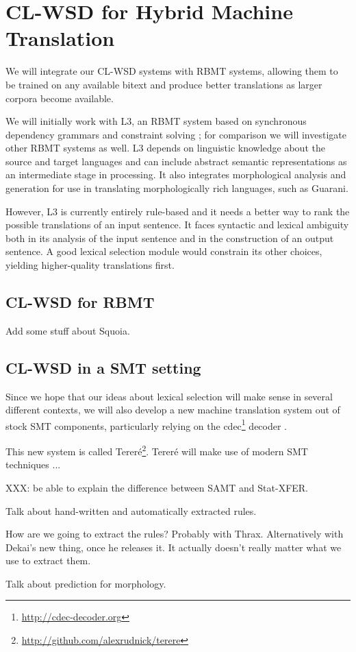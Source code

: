 \section{CL-WSD for Hybrid Machine Translation}
We will integrate our CL-WSD systems with RBMT systems, allowing them
to be trained on any available bitext and produce better translations as larger
corpora become available.

We will initially work with L3, an RBMT system based on synchronous dependency
grammars and constraint solving \cite{gasser:sxdg,gasser:aflat2012};
for comparison we will investigate other RBMT systems as well. L3
depends on linguistic knowledge about the source and target languages and can
include abstract semantic representations as an intermediate stage in
processing. It also integrates morphological analysis and generation for
use in translating morphologically rich languages, such as Guarani.

However, L3 is currently entirely rule-based and it needs a better way to rank
the possible translations of an input sentence. It faces syntactic and lexical
ambiguity both in its analysis of the input sentence and in the construction of
an output sentence.  A good lexical selection module would constrain its other
choices, yielding higher-quality translations first.


\subsection{CL-WSD for RBMT}

Add some stuff about Squoia.


\subsection{CL-WSD in a SMT setting}
Since we hope that our ideas about lexical selection will make sense in several
different contexts, we will also develop a new machine translation system out
of stock SMT components, particularly relying on the
cdec\footnote{\url{http://cdec-decoder.org}} decoder \cite{Dyer_etal_2010}.

This new system is called
Tereré\footnote{\url{http://github.com/alexrudnick/terere}}. Tereré will make
use of modern SMT techniques ...

XXX: be able to explain the difference between SAMT and Stat-XFER.

Talk about hand-written and automatically extracted rules.

How are we going to extract the rules? Probably with Thrax. Alternatively with
Dekai's new thing, once he releases it. It actually doesn't really matter what
we use to extract them.

Talk about prediction for morphology.
\cite{toutanova-suzuki-ruopp:2008:ACLMain}
